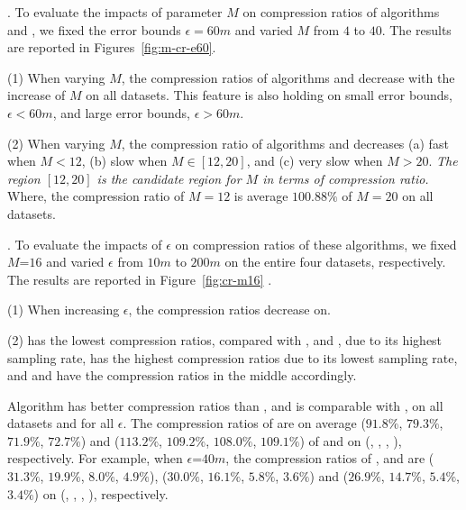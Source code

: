 .
To evaluate the impacts of parameter $M$ on compression ratios of algorithms \cist and \cista, we fixed the error bounds {$\epsilon =60m$} and varied $M$ from $4$ to $40$.
The results are reported in Figures~\ref{fig:m-cr-e60}.

\ni(1) When varying $M$, the compression ratios of algorithms \cist and \cista decrease with the increase of $M$ on all datasets. This feature is also holding on small error bounds, \eg $\epsilon < 60m$, and large error bounds, \eg $\epsilon > 60m$.

\ni(2) When varying $M$, the compression ratio of algorithms \cist and \cista decreases (a) fast when $M < 12$, (b) slow when $M \in [12, 20]$, and (c) very slow when $M  > 20$.
\emph{The region $[12, 20]$ is the candidate region for $M$ in terms of compression ratio.}
Where, the compression ratio of $M=12$ is average {$100.88\%$} of $M=20$ on all datasets.




.
To evaluate the impacts of $\epsilon$ on compression ratios of these algorithms, we fixed {$M$=$16$} and varied $\epsilon$ from $10m$ to $200m$ on the entire four datasets, respectively.
The results are reported in Figure~\ref{fig:cr-m16} .


\ni (1) When increasing $\epsilon$, the compression ratios decrease on.

\ni (2) \pricar has the lowest compression ratios, compared with \truck, \sercar and \geolife, due to its highest sampling rate,
\truck has the highest compression ratios due to its lowest sampling rate, and \sercar and \geolife have the compression ratios in the middle accordingly.

 Algorithm \cist has better compression ratios than \squishe, and is {comparable} with \dps, on all datasets and for all $\epsilon$.
%
The compression ratios of \cist are on average ($91.8\%$, $79.3\%$, $71.9\%$, {$72.7\%$}) and ($113.2\%$, $109.2\%$, $108.0\%$, $109.1\%$) of \squishe and \dps on (\truck, \sercar, \geolife, \pricar), respectively.
%
For example, when $\epsilon$=$40m$, the compression ratios of \squishe, \cist and \dps are ($31.3\%$, $19.9\%$, $8.0\%$, $4.9\%$), ($30.0\%$, $16.1\%$, $5.8\%$, $3.6\%$) and ($26.9\%$, $14.7\%$, $5.4\%$, $3.4\%$) on (\truck, \sercar, \geolife, \pricar), respectively.

